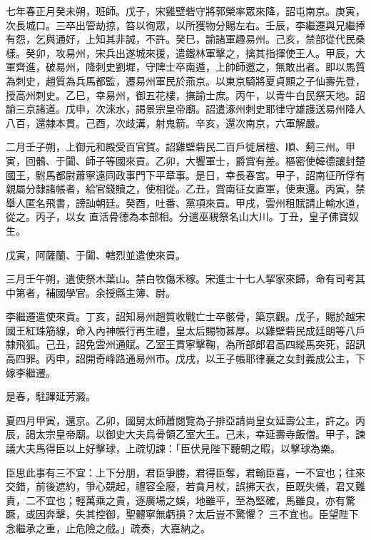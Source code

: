 \begin{pinyinscope}
 七年春正月癸未朔，班師。戊子，宋雞壁砦守將郭榮率眾來降，詔屯南京。庚寅，次長城口。三卒出管劫掠，笞以徇眾，以所獲物分賜左右。壬辰，李繼遷與兄繼捧有怨，乞與通好，上知其非誠，不許。癸巳，諭諸軍趣易州。己亥，禁部從代民桑樣。癸卯，攻易州，宋兵出遂城來援，遣鐵林軍擊之，擒其指揮使王人。甲辰，大軍齊進，破易州，降刺史劉墀，守陴士卒南遁，上帥師邀之，無敢出者。即以馬質為刺史，趙質為兵馬都監，遷易州軍民於燕京。以東京騎將夏貞顯之子仙壽先登，授高州刺史。乙巳，幸易州，御五花樓，撫諭士庶。丙午，以青牛白民祭天地。詔
 諭三京諸道。戊申，次淶水，謁景宗皇帝廟。詔遣涿州刺史耶律守雄護送易州降人八百，還隸本貫。己酉，次歧溝，射鬼箭。辛亥，還次南京，六軍解嚴。



 二月壬子朔，上御元和殿受百官賀。詔雞壁砦民二百戶徙居檀、順、薊三州。甲寅，回鶻、于闐、師子等國來貢。乙卯，大饗軍士，爵賞有差。樞密使韓德讓封楚國王，駙馬都尉蕭寧遠同政事門下平章事。是日，幸長春宮。甲子，詔南征所俘有親屬分隸諸帳者，給官錢贖之，使相從。乙丑，賞南征女直軍，使東還。丙寅，禁舉人匿名飛書，謗訕朝廷。癸酉，吐番、黨項來貢。甲戌，雲州租賦請止輸水道，從之。丙子，以女
 直活骨德為本部相。分遣巫覡祭名山大川。丁丑，皇子佛寶奴生。



 戊寅，阿薩蘭、于闐、轄烈並遣使來貢。



 三月壬午朔，遣使祭木葉山。禁白牧傷禾稼。宋進士十七人挈家來歸，命有司考其中第者，補國學官。余授縣主簿、尉。



 李繼遷遣使來貢。丁亥，詔知易州趙質收戰亡士卒骸骨，築京觀。戊子，賜於越宋國王紅珠筋線，命入內神帳行再生禮，皇太后賜物甚厚。以雞壁砦民成廷朗等八戶隸飛狐。己丑，詔免雲州通賦。乙室王貫寧擊鞠，為所部郎君高四縱馬突死，詔訊高四罪。丙申，詔開奇峰路通易州市。戊戌，以王子帳耶律襄之女封義成公主，下
 嫁李繼遷。



 是春，駐蹕延芳澱。



 夏四月甲寅，還京。乙卯，國舅太師蕭閱覽為子排亞請尚皇女延壽公主，許之。丙辰，謁太宗皇帝廟。以御史大夫烏骨領乙室大王。己未，幸延壽寺飯僧。甲子，諫議大夫馬得臣以上好擊球，上疏切諫：「臣伏見陛下聽朝之暇，以擊球為樂。



 臣思此事有三不宜：上下分朋，君臣爭勝，君得臣奪，君輸臣喜，一不宜也；往來交錯，前後遮約，爭心競起，禮容全廢，若貪月杖，誤拂天衣，臣既失儀，君又難責，二不宜也；輕萬乘之貴，逐廣場之娛，地雖平，至為堅確，馬雖良，亦有驚蹶，或因奔擊，失其控御，聖體寧無虧損？太后豈不驚懼？
 三不宜也。臣望陛下念繼承之重，止危險之戲。」疏奏，大嘉納之。




\end{pinyinscope}
